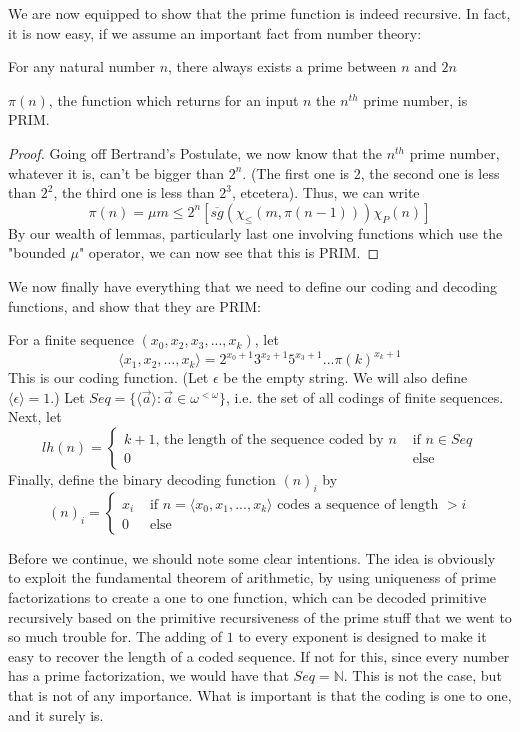 We are now equipped to show that the prime function is indeed recursive. In fact, it is now easy, if we assume an important fact from number theory:
\begin{lemma}
    For any natural number $n$, there always exists a prime between $n$ and $2n$
\end{lemma}
\begin{theorem}
    $\pi(n)$, the function which returns for an input $n$ the $n^{th}$ prime number, is PRIM.
\end{theorem}
\begin{proof}
    Going off Bertrand's Postulate, we now know that the $n^{th}$ prime number, whatever it is, can't be bigger than $2^n$. (The first one is $2$, the second one is less than $2^2$, the third one is less than $2^3$, etcetera). Thus, we can write
    \[ \pi(n) = \mu m \leq 2^n [\overline{sg}(\chi_{\leq}(m,\pi(n-1)))\chi_P(n) ] \]
    By our wealth of lemmas, particularly last one involving functions which use the "bounded $\mu$" operator, we can now see that this is PRIM. 
\end{proof}
We now finally have everything that we need to define our coding and decoding functions, and show that they are PRIM:
\begin{definition}
    For a finite sequence $(x_0,x_2,x_3,...,x_k)$, let 
    \[\langle x_1,x_2,...,x_k \rangle = 2^{x_0+1}3^{x_2+1}5^{x_3+1}...\pi(k)^{x_k+1} \] 
    This is our coding function. (Let $\epsilon$ be the empty string. We will also define $\langle \epsilon \rangle = 1$.) Let $Seq = \{\langle \vec{a} \rangle: \vec{a} \in \omega^{<\omega}\}$, i.e. the set of all codings of finite sequences. Next, let
    \[lh(n) = \begin{cases}
                k+1\textrm{, the length of the sequence coded by $n$} & \textrm{ if $n \in Seq$} \\
                0 & \textrm{ else}
              \end{cases} \]
    Finally, define the binary decoding function $(n)_i$ by
    \[ (n)_i = \begin{cases}
                  x_i & \textrm{ if $n = \langle x_0,x_1,...,x_k \rangle$ codes a sequence of length $> i$} \\
                  0 & \textrm{ else}
               \end{cases}\]
\end{definition}
Before we continue, we should note some clear intentions. The idea is obviously to exploit the fundamental theorem of arithmetic, by using uniqueness of prime factorizations to create a one to one function, which can be decoded primitive recursively based on the primitive recursiveness of the prime stuff that we went to so much trouble for. The adding of $1$ to every exponent is designed to make it easy to recover the length of a coded sequence. If not for this, since every number has a prime factorization, we would have that $Seq = \mathbb{N}$. This is not the case, but that is not of any importance. What is important is that the coding is one to one, and it surely is.
